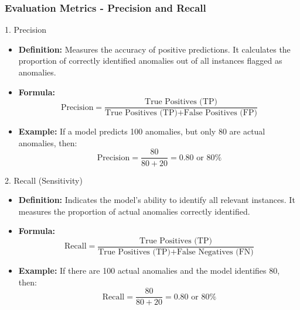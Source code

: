 \documentclass{beamer}
\begin{document}
\begin{frame}[fragile]
    \frametitle{Evaluation Metrics - Precision and Recall}
    \begin{block}{1. Precision}
        \begin{itemize}
            \item \textbf{Definition:} Measures the accuracy of positive predictions. It calculates the proportion of correctly identified anomalies out of all instances flagged as anomalies.
            \item \textbf{Formula:}  
            \[
            \text{Precision} = \frac{\text{True Positives (TP)}}{\text{True Positives (TP)} + \text{False Positives (FP)}}
            \]
            \item \textbf{Example:} If a model predicts 100 anomalies, but only 80 are actual anomalies, then:
            \[
            \text{Precision} = \frac{80}{80 + 20} = 0.80 \text{ or } 80\%
            \]
        \end{itemize}
    \end{block}

    \begin{block}{2. Recall (Sensitivity)}
        \begin{itemize}
            \item \textbf{Definition:} Indicates the model's ability to identify all relevant instances. It measures the proportion of actual anomalies correctly identified.
            \item \textbf{Formula:}  
            \[
            \text{Recall} = \frac{\text{True Positives (TP)}}{\text{True Positives (TP)} + \text{False Negatives (FN)}}
            \]
            \item \textbf{Example:} If there are 100 actual anomalies and the model identifies 80, then:
            \[
            \text{Recall} = \frac{80}{80 + 20} = 0.80 \text{ or } 80\%
            \]
        \end{itemize}
    \end{block}
\end{frame}
\end{document}
